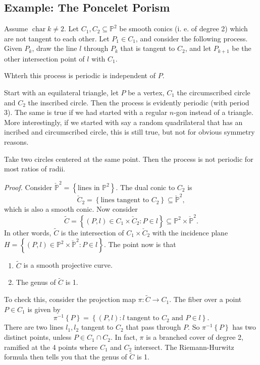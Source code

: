 \subsection{Example: The Poncelet Porism}
Assume \( \operatorname{char} k \neq 2 \).
Let \( C_1, C_2 \subseteq \mathbb{P}^2 \) be smooth conics (i. e. of degree 2) which are not tangent to each other.
Let \( P_1 \in C_1 \), and consider the following process.
Given \( P_k \), draw the line \( l \) through \( P_k \) that is tangent to \( C_2 \), and let \( P_{k+1} \) be the other intersection point of \( l \) with \( C_1 \).
\begin{proposition}
  Whterh this process is periodic is independent of \( P \).
\end{proposition}
\begin{example}
  Start with an equilateral triangle, let \( P \) be a vertex, \( C_1 \) the circumscribed circle and \( C_2 \) the  inscribed circle.
  Then the process is evidently periodic (with period 3). The same is true if we had started with a regular \( n \)-gon instead of a triangle.
  More interestingly, if we started with say a random quadrilateral that has an incribed and circumscribed circle, this is still true, but not for obvious symmetry reasons.
\end{example}
\begin{example}
  Take two circles centered at the same point. Then the process is not periodic for most ratios of radii.
\end{example}
\textit{Proof.}
Consider \( \check{ \mathbb{P}}^2 = \left\lbrace \text{lines in } \mathbb{P}^2 \right\rbrace \).
The dual conic to \( C_2 \) is
\[ \check{C}_2 = \left\lbrace \text{lines tangent to } C_2 \right\rbrace \subseteq \check{ \mathbb{P}}^2 , \]
which is also a smooth conic.
Now consider
\[
\widetilde{C} = \left\lbrace (P,l) \in C_1 \times \check{C}_2 : P \in l \right\rbrace \subseteq \mathbb{P}^2 \times \check{\mathbb{P}}^2 .
\]
In other words, \( \widetilde{C} \) is the intersection of \( C_1 \times \check{C}_2 \) with the incidence plane \( H = \left\lbrace (P,l) \in \mathbb{P}^2 \times \check{\mathbb{P}}^2 : P \in l \right\rbrace \).
The point now is that
\begin{enumerate}
\item \( \widetilde{C} \) is a smooth projective curve.
\item The genus of \( \widetilde{C} \) is 1.  
\end{enumerate}
To check this, consider the projection map \( \pi \colon \widetilde{C} \to C_1 \). The fiber over a point \( P \in C_1 \) is given by
\[ \pi^{-1} \left\lbrace P \right\rbrace = \left\lbrace (P,l) : l \text{ tangent to } C_2 \text{ and } P \in l \right\rbrace . \]
There are two lines \( l_1,l_2 \) tangent to \( C_2 \) that pass through \( P \).
So \( \pi^{-1} \left\lbrace P \right\rbrace \) has two distinct points, unless \( P \in C_1 \cap C_2 \).
In fact, \( \pi \) is a branched cover of degree 2, ramified at the 4 points where \( C_1 \) and \( C_2 \) intersect.
The Riemann-Hurwitz formula then tells you that the genus of \( \widetilde{C} \) is 1.


